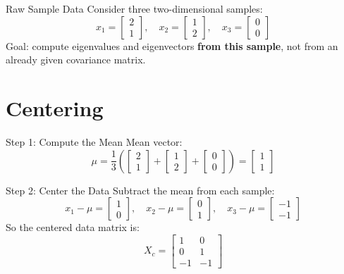 \documentclass[aspectratio=169]{beamer}
\begin{document}
\begin{frame}{Raw Sample Data}
  Consider three two-dimensional samples:
  \[
    x_1 =
    \begin{bmatrix}
      2\\1
    \end{bmatrix},
    \quad
    x_2 =
    \begin{bmatrix}
      1\\2
    \end{bmatrix},
    \quad
    x_3 =
    \begin{bmatrix}
      0\\0
    \end{bmatrix}
  \]
  \vspace{0.3em}
  Goal: compute eigenvalues and eigenvectors \textbf{from this sample}, not from an already given covariance matrix.
\end{frame}

\section{Centering}

\begin{frame}{Step 1: Compute the Mean}
  Mean vector:
  \[
    \mu =
    \frac{1}{3}
    \left(
    \begin{bmatrix}
      2\\1
    \end{bmatrix}
    +
    \begin{bmatrix}
      1\\2
    \end{bmatrix}
    +
    \begin{bmatrix}
      0\\0
    \end{bmatrix}
    \right)
    =
    \begin{bmatrix}
      1\\1
    \end{bmatrix}
  \]
\end{frame}

\begin{frame}{Step 2: Center the Data}
  Subtract the mean from each sample:
  \[
    x_1 - \mu =
    \begin{bmatrix}
      1\\0
    \end{bmatrix},
    \quad
    x_2 - \mu =
    \begin{bmatrix}
      0\\1
    \end{bmatrix},
    \quad
    x_3 - \mu =
    \begin{bmatrix}
      -1\\-1
    \end{bmatrix}
  \]
  So the centered data matrix is:
  \[
    X_c =
    \begin{bmatrix}
      1 & 0\\
      0 & 1\\
      -1 & -1
    \end{bmatrix}
  \]
\end{frame}
\end{document}
